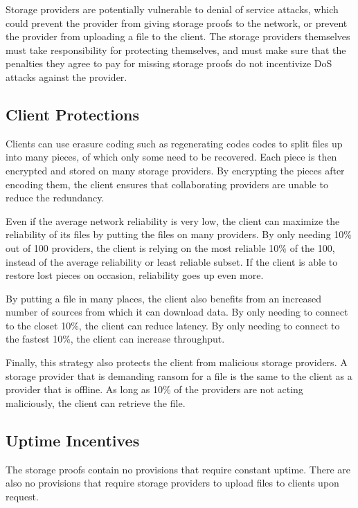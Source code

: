\documentclass[twocolumn]{article}
\begin{document}
Storage providers are potentially vulnerable to denial of service attacks, which could prevent the provider from giving storage proofs to the network, or prevent the provider from uploading a file to the client.
The storage providers themselves must take responsibility for protecting themselves, and must make sure that the penalties they agree to pay for missing storage proofs do not incentivize DoS attacks against the provider.

\subsection{Client Protections}
Clients can use erasure coding such as regenerating codes \cite{reg} codes to split files up into many pieces, of which only some need to be recovered.
Each piece is then encrypted and stored on many storage providers.
By encrypting the pieces after encoding them, the client ensures that collaborating providers are unable to reduce the redundancy.

Even if the average network reliability is very low, the client can maximize the reliability of its files by putting the files on many providers.
By only needing 10\% out of 100 providers, the client is relying on the most reliable 10\% of the 100, instead of the average reliability or least reliable subset.
If the client is able to restore lost pieces on occasion, reliability goes up even more.

By putting a file in many places, the client also benefits from an increased number of sources from which it can download data.
By only needing to connect to the closet 10\%, the client can reduce latency.
By only needing to connect to the fastest 10\%, the client can increase throughput.

Finally, this strategy also protects the client from malicious storage providers.
A storage provider that is demanding ransom for a file is the same to the client as a provider that is offline.
As long as 10\% of the providers are not acting maliciously, the client can retrieve the file.

\subsection{Uptime Incentives}
The storage proofs contain no provisions that require constant uptime.
There are also no provisions that require storage providers to upload files to clients upon request.
\end{document}
